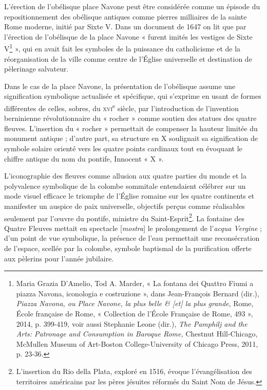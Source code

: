 \documentclass[12pt,twoside,openany]{book}
\begin{document}
L’érection de l’obélisque place Navone peut être considérée comme un épisode du repositionnement des obélisque antiques comme pierres milliaires de la sainte Rome moderne, initié par Sixte V. Dans un document de 1647 on lit que par l’érection de l’obélisque de la place Navone « furent imités les vestiges de Sixte V\footnote{Maria Grazia D’Amelio, Tod A. Marder, « La fontana dei Quattro Fiumi a piazza Navona, iconologia e costruzione », dans Jean-François Bernard (dir.), \textit{Piazza Navona, ou Place Navone, la plus belle \& [et] la plus grande}, Rome, École française de Rome, « Collection de l’École Française de Rome, 493 », 2014, p. 399-419, voir aussi Stephanie Leone (dir.), \textit{The Pamphilj and the Arts: Patronage and Consumption in Baroque Rome, }Chestnut Hill-Chicago, McMullen Museum of Art-Boston College-University of Chicago Press, 2011, p. 23-36.} », qui en avait fait les symboles de la puissance du catholicisme et de la réorganisation de la ville comme centre de l’Église universelle et destination de pèlerinage salvateur.

Dans le cas de la place Navone, la présentation de l’obélisque assume une signification symbolique actualisée et spécifique, qui s’exprime en usant de formes différentes de celles, sobres, du \textsc{xvi}\textsuperscript{e} siècle, par l’introduction de l’invention berninienne révolutionnaire du « rocher » comme soutien des statues des quatre fleuves. L’insertion du « rocher » permettait de compenser la hauteur limitée du monument antique ; d’autre part, sa structure en X soulignait sa signification de symbole solaire orienté vers les quatre points cardinaux tout en évoquant le chiffre antique du nom du pontife, Innocent « X ».

L’iconographie des fleuves comme allusion aux quatre parties du monde et la polyvalence symbolique de la colombe sommitale entendaient célébrer sur un mode visuel efficace le triomphe de l’Église romaine sur les quatre continents et manifester un auspice de paix universelle, objectifs perçus comme réalisables seulement par l’œuvre du pontife, ministre du Saint-Esprit\footnote{L’insertion du Rio della Plata, exploré en 1516, évoque l’évangélisation des territoires américains par les pères jésuites réformés du Saint Nom de Jésus.}. La fontaine des Quatre Fleuves mettait en spectacle [\textit{mostra}] le prolongement de l’\textit{acqua Vergine} ; d’un point de vue symbolique, la présence de l’eau permettait une reconsécration de l’espace, scellée par la colombe, symbole baptismal de la purification offerte aux pèlerins pour l’année jubilaire.
\end{document}
